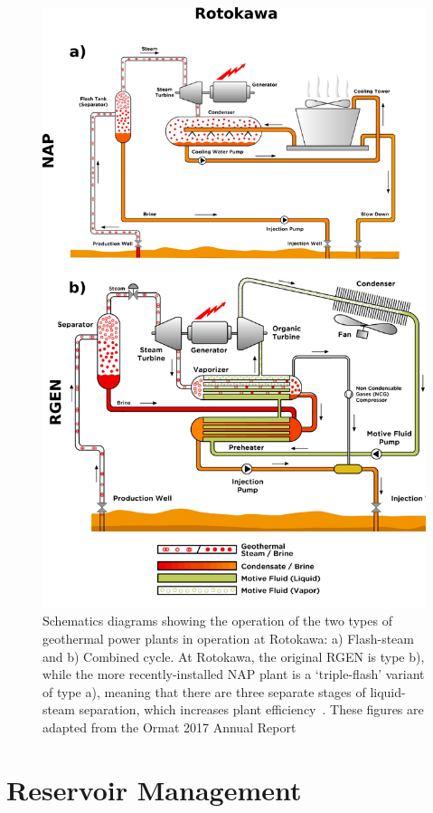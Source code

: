 \begin{figure}[p]
\begin{center}
\includegraphics[width=0.85\columnwidth]{Chapter_1_Intro/figures/ORMAT_techs_overview/Rotokawa_schematic}
\caption[Schematic diagrams of Rotokawa geothermal power plant design]{{
Schematics diagrams showing the operation of the two types of geothermal power plants in operation at Rotokawa: a) Flash-steam and b) Combined cycle. At Rotokawa, the
original \acrfull{RGEN} is type b), while the more recently-installed \acrfull{NAP} plant is a `triple-flash' variant of type a), meaning that
there are three separate stages of liquid-steam separation, which
increases plant efficiency~\protect\cite{DiPippo_2016}. These figures are adapted from the Ormat 2017 Annual Report~\protect\cite{Ormat_2018}
{\label{rot_plants}}%
}}
\end{center}
\end{figure}

\section{Reservoir Management}

